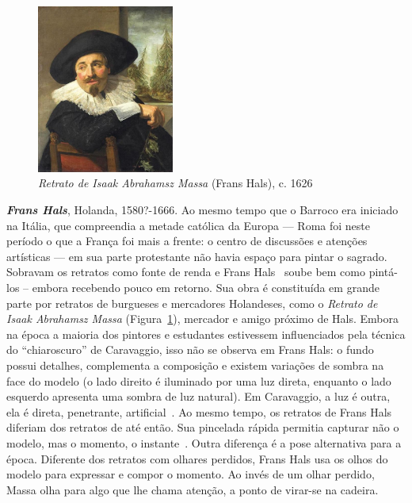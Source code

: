 \begin{figure}
  \begin{center}
    \includegraphics[width=0.4\textwidth]{figs/hals_massa.png}
  \end{center}
  \caption{\emph{Retrato de Isaak Abrahamsz Massa} (Frans Hals), c. 1626}
  \label{fig:hals:massa}
\end{figure}

\textbf{\emph{Frans Hals}}, Holanda, 1580?-1666. Ao mesmo tempo que o
Barroco era iniciado na Itália, que compreendia a metade católica da
Europa --- Roma foi neste período o que a França foi mais a frente: o
centro de discussões e atenções artísticas --- em sua parte
protestante não havia espaço para pintar o sagrado.~\cite{gombrich}
Sobravam os retratos como fonte de renda e Frans Hals~\cite{grimm}
soube bem como pintá-los -- embora recebendo pouco em retorno. Sua
obra é constituída em grande parte por retratos de burgueses e
mercadores Holandeses, como o \textit{Retrato de Isaak Abrahamsz
  Massa} (Figura~\ref{fig:hals:massa}), mercador e amigo próximo de
Hals.  Embora na época a maioria dos pintores e estudantes estivessem
influenciados pela técnica do ``chiaroscuro'' de Caravaggio, isso não
se observa em Frans Hals: o fundo possui detalhes, complementa a
composição e existem variações de sombra na face do modelo (o lado
direito é iluminado por uma luz direta, enquanto o lado esquerdo
apresenta uma sombra de luz natural). Em Caravaggio, a luz é outra,
ela é direta, penetrante, artificial~\cite{gombrich}. Ao mesmo tempo,
os retratos de Frans Hals diferiam dos retratos de até então. Sua
pincelada rápida permitia capturar não o modelo, mas o momento, o
instante~\cite{peter}. Outra diferença é a pose alternativa para a
época. Diferente dos retratos com olhares perdidos, Frans Hals usa os
olhos do modelo para expressar e compor o momento. Ao invés de um
olhar perdido, Massa olha para algo que lhe chama atenção, a ponto de
virar-se na cadeira.

